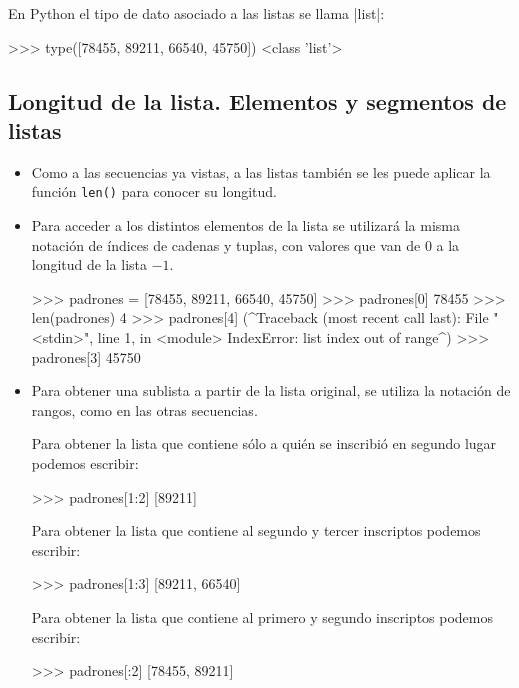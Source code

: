\begin{observacion}
En Python el tipo de dato asociado a las listas se llama |list|:

\begin{codigo-python-sn}
>>> type([78455, 89211, 66540, 45750])
<class 'list'>
\end{codigo-python-sn}
\end{observacion}

\subsection{Longitud de la lista. Elementos y segmentos de listas}

\begin{itemize}

\item Como a las secuencias ya vistas, a las listas también se les puede
aplicar la función \lstinline+len()+ para conocer su longitud.

\item Para acceder a los distintos elementos de la lista se utilizará la
misma notación de índices de cadenas y tuplas, con valores que van de $0$ a la
longitud de la lista $- 1$.

\begin{codigo-python-sn}
>>> padrones = [78455, 89211, 66540, 45750]
>>> padrones[0]
78455
>>> len(padrones)
4
>>> padrones[4]
(^Traceback (most recent call last):
  File "<stdin>", line 1, in <module>
IndexError: list index out of range^)
>>> padrones[3]
45750
\end{codigo-python-sn}

\item Para obtener una sublista a partir de la lista original, se utiliza
la notación de rangos, como en las otras secuencias.

Para obtener la lista que contiene sólo a quién se inscribió en segundo
lugar podemos escribir:

\begin{codigo-python-sn}
>>> padrones[1:2]
[89211]
\end{codigo-python-sn}

Para obtener la lista que contiene al segundo y tercer inscriptos
podemos escribir:

\begin{codigo-python-sn}
>>> padrones[1:3]
[89211, 66540]
\end{codigo-python-sn}

Para obtener la lista que contiene al primero y segundo inscriptos
podemos escribir:

\begin{codigo-python-sn}
>>> padrones[:2]
[78455, 89211]
\end{codigo-python-sn}

\end{itemize}

